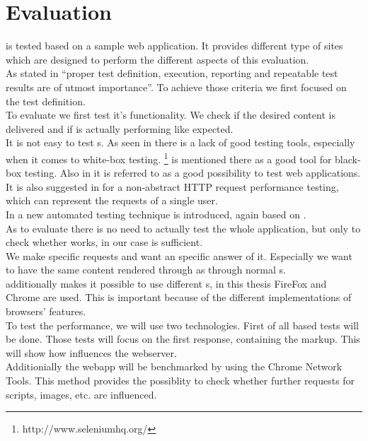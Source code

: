 \section{Evaluation}
\lare{} is tested based on a sample web application.
It provides different type of sites which are designed to perform the different aspects of this evaluation.
\\
As stated in \cite{palomaki2010web} \enquote{proper test definition, execution, reporting and repeatable test results are of utmost importance}.
To achieve those criteria we first focused on the test definition.
\\
To evaluate \lare{} we first test it's functionality.
We check if the desired content is delivered and if \lare{} is actually performing like expected.
\\
It is not easy to test \ajax{} \webApplication{}s.
As seen in \cite{marchetto2007testing} there is a lack of good testing tools, especially when it comes to white-box testing.
\selenium{}\footnote{http://www.seleniumhq.org/} is mentioned there as a good tool for black-box testing.
Also in \cite{lundmarkautomatic} it is referred to as a good possibility to test web applications.
It is also suggested in \cite{palomaki2010web} for a non-abstract HTTP request performance testing, which can represent the requests of a single user.
\\
In \cite{marchetto2008state} a new automated testing technique is introduced, again based on \selenium{}.
\\
As to evaluate \lare{} there is no need to actually test the whole application, but only to check whether \lare{} works, \selenium{} in our case is sufficient.
\\
We make specific requests and want an specific answer of it.
Especially we want to have the same content rendered through \lare{} as through normal \httpRequest{}s.
\\
\selenium{} additionally makes it possible to use different \webdriver{}s, in this thesis FireFox and Chrome are used.
This is important because of the different implementations of browsers' features.
\\
To test the performance, we will use two technologies.
\cite{bozdag2008performance}
First of all \curl{} based tests will be done.
Those tests will focus on the first response, containing the markup.
This will show how \lare{} influences the webserver.
\\
Additionially the webapp will be benchmarked by using the Chrome Network Tools.
This method provides the possiblity to check whether further requests for scripts, images, etc. are influenced.
